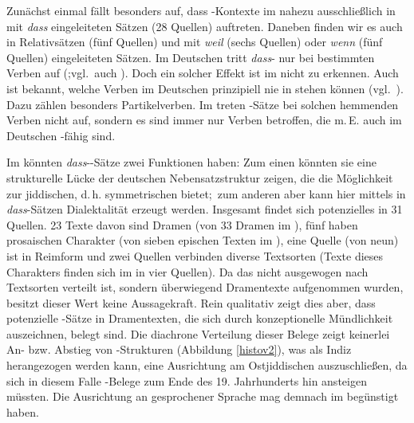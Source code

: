  

Zunächst einmal fällt besonders auf, dass -Kontexte im  nahezu ausschließlich in mit \textit{dass}  eingeleiteten Sätzen (28 Quellen) auftreten. Daneben finden wir es auch in Relativsätzen (fünf Quellen) und mit \textit{weil} (sechs Quellen) oder \textit{wenn} (fünf Quellen) eingeleiteten Sätzen. Im Deutschen tritt \textit{dass}- nur bei bestimmten Verben auf (\citealt{Freywald2008,Freywald2009};vgl.\, auch \citealt{Reis2006}). Doch ein solcher Effekt ist im \hai{{\LiJi}} nicht zu erkennen. Auch ist bekannt, welche Verben im Deutschen prinzipiell nie in  stehen können (vgl.\, \citealt{FreywaldSimon2007}). Dazu zählen besonders Partikelverben. Im \hai{{\LiJi}} treten -Sätze bei solchen  hemmenden Verben nicht auf, sondern es sind immer nur Verben betroffen, die m.\,E. auch im Deutschen -fähig sind.

Im \hai{{\LiJi}} könnten \textit{dass}--Sätze zwei Funktionen haben: Zum einen könnten sie eine strukturelle Lücke der deutschen Nebensatzstruktur zeigen, die die Möglichkeit zur  jiddischen, d.\,h. symmetrischen  bietet;\, zum anderen aber kann hier mittels  in \textit{dass}-Sätzen Dialektalität erzeugt werden. Insgesamt findet sich potenzielles  in 31 Quellen. 23 Texte davon sind Dramen (von 33 Dramen im ), fünf haben prosaischen Charakter (von sieben epischen Texten im ), eine Quelle (von neun) ist in Reimform und zwei Quellen verbinden diverse Textsorten (Texte dieses Charakters finden sich im  in vier Quellen). Da das  nicht ausgewogen nach Textsorten verteilt ist, sondern überwiegend Dramentexte aufgenommen wurden, besitzt dieser Wert keine Aussagekraft. Rein qualitativ zeigt dies aber, dass potenzielle -Sätze in Dramentexten, die sich durch konzeptionelle Mündlichkeit auszeichnen, belegt sind. Die diachrone Verteilung dieser Belege zeigt keinerlei An- bzw. Abstieg von -Strukturen (Abbildung \ref{histov2}), was als Indiz herangezogen werden kann, eine Ausrichtung am Ostjiddischen  auszuschließen, da sich in diesem Falle -Belege zum Ende des 19. Jahrhunderts hin ansteigen müssten. Die Ausrichtung an gesprochener Sprache mag demnach  im  begünstigt haben. 


